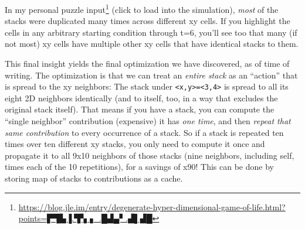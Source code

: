 \documentclass[]{article}
\renewcommand{\href}[2]{#2\footnote{\url{#1}}}
\begin{document}
In my
\href{https://blog.jle.im/entry/degenerate-hyper-dimensional-game-of-life.html?points=▛▜▙▐.▜▚▗_.█▟▄▘.▟▌▟█}{personal
puzzle input} (click to load into the simulation), \emph{most} of the stacks
were duplicated many times across different xy cells. If you highlight the cells
in any arbitrary starting condition through t=6, you'll see too that many (if
not most) xy cells have multiple other xy cells that have identical stacks to
them.

This final insight yields the final optimization we have discovered, as of time
of writing. The optimization is that we can treat an \emph{entire stack} as an
``action'' that is spread to the xy neighbors: The stack under
\texttt{\textless{}x,y\textgreater{}=\textless{}3,4\textgreater{}} is spread to
all its eight 2D neighbors identically (and to itself, too, in a way that
excludes the original stack itself). That means if you have a stack, you can
compute the ``single neighbor'' contribution (expensive) it has \emph{one time},
and then \emph{repeat that same contribution} to every occurrence of a stack. So
if a stack is repeated ten times over ten different xy stacks, you only need to
compute it once and propagate it to all 9x10 neighbors of those stacks (nine
neighbors, including self, times each of the 10 repetitions), for a savings of
x90! This can be done by storing map of stacks to contributions as a cache.
\end{document}
